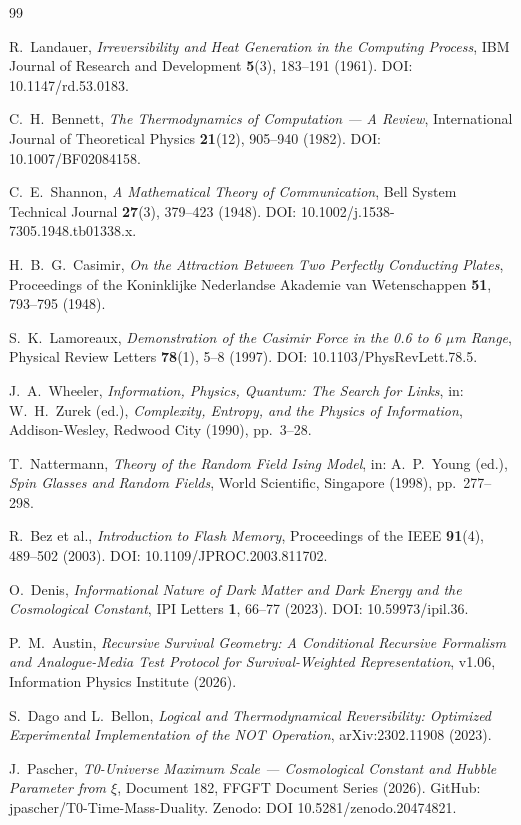 \begin{thebibliography}{99}

R.~Landauer,
\textit{Irreversibility and Heat Generation in the Computing Process},
IBM Journal of Research and Development \textbf{5}(3), 183--191 (1961).
DOI: 10.1147/rd.53.0183.

C.~H.~Bennett,
\textit{The Thermodynamics of Computation — A Review},
International Journal of Theoretical Physics \textbf{21}(12), 905--940 (1982).
DOI: 10.1007/BF02084158.

C.~E.~Shannon,
\textit{A Mathematical Theory of Communication},
Bell System Technical Journal \textbf{27}(3), 379--423 (1948).
DOI: 10.1002/j.1538-7305.1948.tb01338.x.

H.~B.~G.~Casimir,
\textit{On the Attraction Between Two Perfectly Conducting Plates},
Proceedings of the Koninklijke Nederlandse Akademie van Wetenschappen
\textbf{51}, 793--795 (1948).

S.~K.~Lamoreaux,
\textit{Demonstration of the Casimir Force in the 0.6 to 6 $\mu$m Range},
Physical Review Letters \textbf{78}(1), 5--8 (1997).
DOI: 10.1103/PhysRevLett.78.5.

J.~A.~Wheeler,
\textit{Information, Physics, Quantum: The Search for Links},
in: W.~H.~Zurek (ed.), \textit{Complexity, Entropy, and the Physics of
Information}, Addison-Wesley, Redwood City (1990), pp.~3--28.

T.~Nattermann,
\textit{Theory of the Random Field Ising Model},
in: A.~P.~Young (ed.), \textit{Spin Glasses and Random Fields},
World Scientific, Singapore (1998), pp.~277--298.

R.~Bez et al.,
\textit{Introduction to Flash Memory},
Proceedings of the IEEE \textbf{91}(4), 489--502 (2003).
DOI: 10.1109/JPROC.2003.811702.

O.~Denis,
\textit{Informational Nature of Dark Matter and Dark Energy and the
Cosmological Constant},
IPI Letters \textbf{1}, 66--77 (2023).
DOI: 10.59973/ipil.36.

P.~M.~Austin,
\textit{Recursive Survival Geometry: A Conditional Recursive Formalism
and Analogue-Media Test Protocol for Survival-Weighted Representation},
v1.06, Information Physics Institute (2026).

S.~Dago and L.~Bellon,
\textit{Logical and Thermodynamical Reversibility: Optimized Experimental
Implementation of the NOT Operation},
arXiv:2302.11908 (2023).

J.~Pascher,
\textit{T0-Universe Maximum Scale — Cosmological Constant and Hubble
Parameter from $\xi$},
Document 182, FFGFT Document Series (2026).
GitHub: jpascher/T0-Time-Mass-Duality.
Zenodo: DOI 10.5281/zenodo.20474821.

\end{thebibliography}

